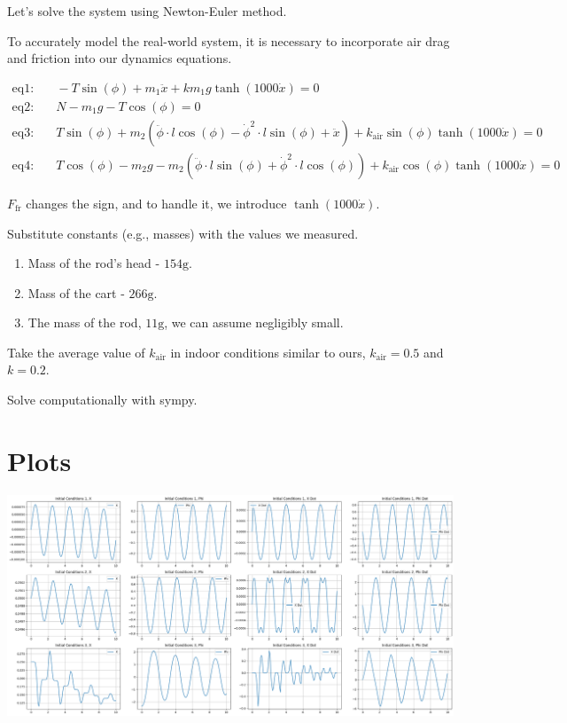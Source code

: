 \documentclass{article}
\begin{document}
Let's solve the system using Newton-Euler method.

To accurately model the real-world system, it is necessary to incorporate air drag and friction into our dynamics equations.

\begin{align*}
  \text{eq1:} & \quad -T \sin(\phi) + m_1 \ddot{x} + k m_1 g \tanh(1000 \dot{x}) = 0 \\
  \text{eq2:} & \quad N - m_1 g - T \cos(\phi) = 0 \\
  \text{eq3:} & \quad T \sin(\phi) + m_2 \left(\ddot{\phi} \cdot l \cos(\phi) - \dot{\phi}^2 \cdot l \sin(\phi) + \ddot{x}\right) + k_{\text{air}} \sin(\phi) \tanh(1000 \dot{x}) = 0 \\
  \text{eq4:} & \quad T \cos(\phi) - m_2 g - m_2 \left(\ddot{\phi} \cdot l \sin(\phi) + \dot{\phi}^2 \cdot l \cos(\phi)\right) + k_{\text{air}} \cos(\phi) \tanh(1000 \dot{x}) = 0
\end{align*}
  
$F_\text{fr}$ changes the sign, and to handle it, we introduce $\tanh(1000 \dot{x})$.

Substitute constants (e.g., masses) with the values we measured.

\begin{enumerate}
  \item Mass of the rod's head - $154 \text{g}$.

  \item Mass of the cart - $266 \text{g}$.

  \item The mass of the rod, $11 \text{g}$, we can assume negligibly small.
\end{enumerate}

Take the average value of $k_\text{air}$ in indoor conditions similar to ours, $k_\text{air} = 0.5$ and $k = 0.2$.

Solve computationally with sympy.

\section{Plots}
\includegraphics*[scale=0.25]{plots/analytical_sol_plots.png}
\end{document}
